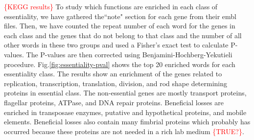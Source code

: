 \documentclass[12pt,letterpaper]{article}
\begin{document}
\textcolor{red}{\{KEGG results\}} To study which functions are enriched in each class of essentiality, we have gathered the``note" section for each gene from their embl files. Then, we have counted the repeat number of each word for the genes in each class and the genes that do not belong to that class and the number of all other words in these two groups and used a Fisher's exact test to calculate P-values. The P-values are then corrected using Benjamini-Hochberg-Yekutieli procedure. Fig.\@ \ref{fig:essentiality-pval} shows the top 20 enriched words for each essentiality class. The results show an enrichment of the genes related to replication, transcription, translation, division, and rod shape determining proteins in essential class. The non-essential genes are mostly transport proteins, flagellar proteins, ATPase, and DNA repair proteins. Beneficial losses are enriched in transposase enzymes, putative and hypothetical proteins, and mobile elements. Beneficial losses also contain many fimbrial proteins which probably has occurred because these proteins are not needed in a rich lab medium \textcolor{red}{\{TRUE?\}}.
\end{document}

